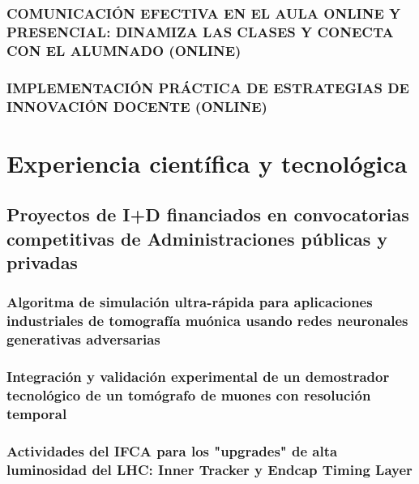 \documentclass[a4paper, 11pt, twoside, openright]{report}
\begin{document}
\subsection{COMUNICACIÓN EFECTIVA EN EL AULA ONLINE Y PRESENCIAL: DINAMIZA LAS CLASES Y CONECTA CON EL ALUMNADO (ONLINE)}


\subsection{IMPLEMENTACIÓN PRÁCTICA DE ESTRATEGIAS DE INNOVACIÓN DOCENTE (ONLINE)}


\chapter{Experiencia científica y tecnológica}

\section{Proyectos de I+D financiados en convocatorias competitivas de Administraciones públicas y privadas}

\subsection{Algoritma de simulación ultra-rápida para aplicaciones industriales de tomografía muónica usando redes neuronales generativas adversarias}


\subsection{Integración y validación experimental de un demostrador tecnológico de un tomógrafo de muones con resolución temporal}


\subsection{Actividades del IFCA para los "upgrades" de alta luminosidad del LHC: Inner Tracker y Endcap Timing Layer}

\end{document}
